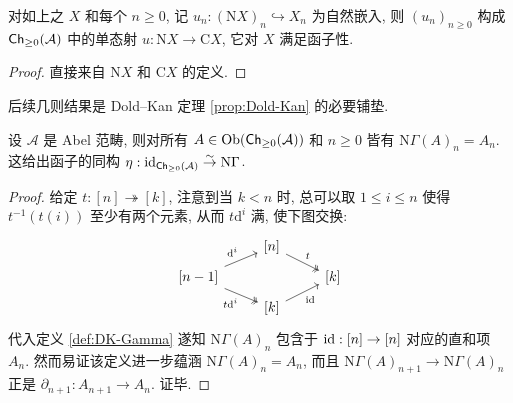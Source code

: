 \begin{proposition}\label{prop:Dold-Kan-u}
	对如上之 $X$ 和每个 $n \geq 0$, 记 $u_n: (\mathrm{N}X)_n \hookrightarrow X_n$ 为自然嵌入, 则 $(u_n)_{n \geq 0}$ 构成 $\mathsf{Ch}_{\geq 0}(\mathcal{A})$ 中的单态射 $u: \mathrm{N}X \to \mathrm{C}X$, 它对 $X$ 满足函子性.
\end{proposition}
\begin{proof}
	直接来自 $\mathrm{N}X$ 和 $\mathrm{C}X$ 的定义.
\end{proof}

后续几则结果是 Dold--Kan 定理 \ref{prop:Dold-Kan} 的必要铺垫.

\begin{lemma}\label{prop:DK-N-unit}
	设 $\mathcal{A}$ 是 Abel 范畴, 则对所有 $A \in \operatorname{Ob}(\mathsf{Ch}_{\geq 0}(\mathcal{A}))$ 和 $n \geq 0$ 皆有 $\mathrm{N}\Gamma(A)_n = A_n$. 这给出函子的同构 $\eta: \mathrm{id}_{\mathsf{Ch}_{\geq 0}(\mathcal{A})} \stackrel{\sim}{\rightarrow} \mathrm{N}\Gamma$.
\end{lemma}
\begin{proof}
	给定 $t: [n] \twoheadrightarrow [k]$, 注意到当 $k < n$ 时, 总可以取 $1 \leq i \leq n$ 使得 $t^{-1}(t(i))$ 至少有两个元素, 从而 $t \mathrm{d}^i$ 满, 使下图交换:
	\[\begin{tikzcd}[row sep=tiny]
		& {[n]} \arrow[twoheadrightarrow, rd, "t"] & \\
		{[n-1]} \arrow[ru, "{\mathrm{d}^i}"] \arrow[twoheadrightarrow, rd, "{t\mathrm{d}^i}"'] & & {[k]} \\
		& {[k]} \arrow[ru, "{\identity}"'] &
	\end{tikzcd}\]
	代入定义 \ref{def:DK-Gamma} 遂知 $\mathrm{N}\Gamma(A)_n$ 包含于 $\mathrm{id}: [n] \to [n]$ 对应的直和项 $A_n$. 然而易证该定义进一步蕴涵 $\mathrm{N}\Gamma(A)_n = A_n$, 而且 $\mathrm{N}\Gamma(A)_{n+1} \to \mathrm{N}\Gamma(A)_n$ 正是 $\partial_{n+1}: A_{n+1} \to A_n$. 证毕.
\end{proof}

